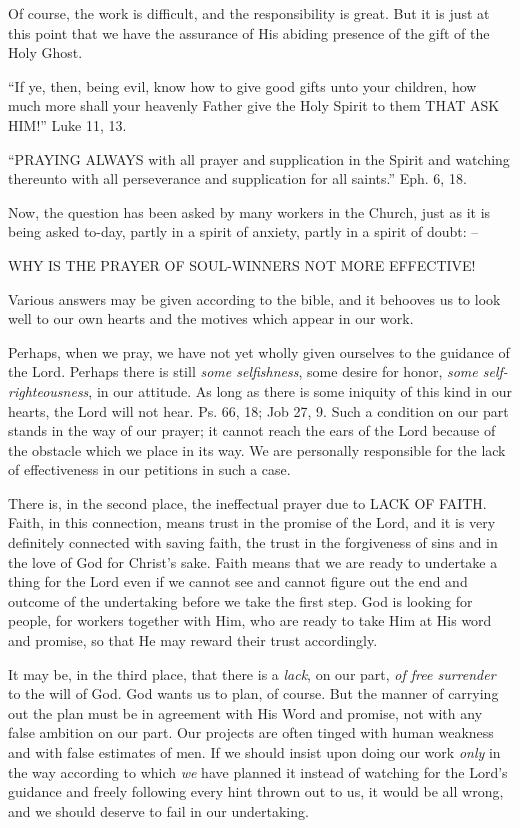 \documentclass[
]{book}
\begin{document}
Of course, the work is difficult, and the responsibility is great. But it is just at this point that we have the assurance of His abiding presence of the gift of the Holy Ghost.

``If ye, then, being evil, know how to give good gifts unto your children, how much more shall your heavenly Father give the Holy Spirit to them THAT ASK HIM!'' Luke 11, 13.

``PRAYING ALWAYS with all prayer and supplication in the Spirit and watching thereunto with all perseverance and supplication for all saints.'' Eph. 6, 18.

Now, the question has been asked by many workers in the Church, just as it is being asked to-day, partly in a spirit of anxiety, partly in a spirit of doubt: --

WHY IS THE PRAYER OF SOUL-WINNERS NOT MORE EFFECTIVE!

Various answers may be given according to the bible, and it behooves us to look well to our own hearts and the motives which appear in our work.

Perhaps, when we pray, we have not yet wholly given ourselves to the guidance of the Lord. Perhaps there is still \emph{some selfishness}, some desire for honor, \emph{some self-righteousness}, in our attitude. As long as there is some iniquity of this kind in our hearts, the Lord will not hear. Ps. 66, 18; Job 27, 9. Such a condition on our part stands in the way of our prayer; it cannot reach the ears of the Lord because of the obstacle which we place in its way. We are personally responsible for the lack of effectiveness in our petitions in such a case.

There is, in the second place, the ineffectual prayer due to LACK OF FAITH. Faith, in this connection, means trust in the promise of the Lord, and it is very definitely connected with saving faith, the trust in the forgiveness of sins and in the love of God for Christ's sake. Faith means that we are ready to undertake a thing for the Lord even if we cannot see and cannot figure out the end and outcome of the undertaking before we take the first step. God is looking for people, for workers together with Him, who are ready to take Him at His word and promise, so that He may reward their trust accordingly.

It may be, in the third place, that there is a \emph{lack}, on our part, \emph{of free surrender} to the will of God. God wants us to plan, of course. But the manner of carrying out the plan must be in agreement with His Word and promise, not with any false ambition on our part. Our projects are often tinged with human weakness and with false estimates of men. If we should insist upon doing our work \emph{only} in the way according to which \emph{we} have planned it instead of watching for the Lord's guidance and freely following every hint thrown out to us, it would be all wrong, and we should deserve to fail in our undertaking.
\end{document}
